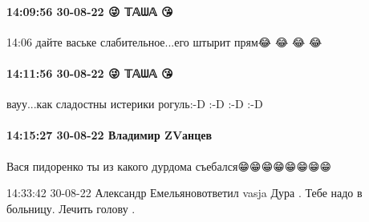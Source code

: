  
 
 
 
 

\paragraph{14:09:56 30-08-22 😜 𝕋𝔸ᗯ𝔸 😘}
14:06
дайте ваське слабительное...его штырит прям😂 😂 😂 😂

\paragraph{14:11:56 30-08-22 😜 𝕋𝔸ᗯ𝔸 😘}

вауу...как сладостны истерики рогуль:-D :-D :-D :-D

\paragraph{14:15:27 30-08-22 Владимир ZVанцев}
Вася пидоренко ты из какого дурдома съебался😁😁😁😁😁😁😁😁

14:33:42 30-08-22
Александр Емельяновответил vasja
Дура . Тебе надо в больницу. Лечить голову .

